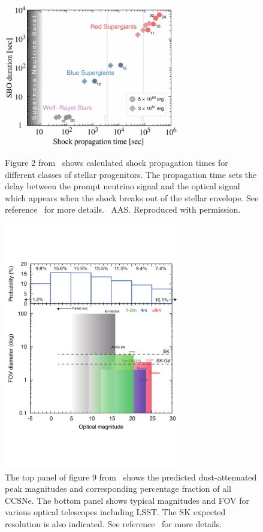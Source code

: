 \documentclass[12pt, letterpaper]{article}
\begin{document}
\begin{figure}
  \begin{center}
    \begin{minipage}[b]{3.1in}
      \includegraphics[width=3.0in]{apj487119f2_hr}
      \caption{Figure 2 from~\cite{2013ApJ...778...81K} shows
        calculated shock propagation times for different classes of
        stellar progenitors.  The propagation time sets the delay
        between the prompt neutrino signal and the optical signal
        which appears when the shock breaks out of the stellar
        envelope.  See reference~\cite{2013ApJ...778...81K} for more
        details. \textcopyright~AAS. Reproduced with permission.}
      \label{fig:delay-times}
    \end{minipage}
    \hspace{0.2in}
    \begin{minipage}[b]{3.1in}
      \includegraphics[width=3.0in]{fig9}
      \caption{The top panel of figure 9
        from~\cite{2016MNRAS.461.3296N} shows the predicted
        dust-attenuated peak magnitudes and corresponding percentage
        fraction of all CCSNe.  The bottom panel shows typical
        magnitudes and FOV for various optical telescopes including
        LSST.  The SK expected resolution is also indicated.  See
        reference~\cite{2016MNRAS.461.3296N} for more details.}
      \label{fig:multimessenger-comparison}
    \end{minipage}
  \end{center}
\end{figure}
\end{document}
